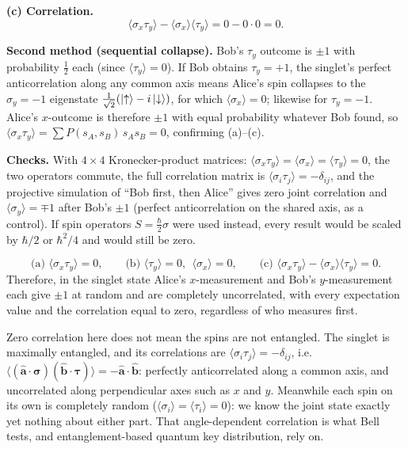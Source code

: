 \documentclass[12pt]{article}
\begin{document}
\begin{solutionbox}
\textbf{(c) Correlation.}
\[
\langle\sigma_x\tau_y\rangle-\langle\sigma_x\rangle\langle\tau_y\rangle=0-0\cdot0=0 .
\]

\textbf{Second method (sequential collapse).} Bob's $\tau_y$ outcome is $\pm1$ with probability $\tfrac12$ each (since $\langle\tau_y\rangle=0$). If Bob obtains $\tau_y=+1$, the singlet's perfect anticorrelation along any common axis means Alice's spin collapses to the $\sigma_y=-1$ eigenstate $\frac{1}{\sqrt2}(\ket{\uparrow}-i\ket{\downarrow})$, for which $\langle\sigma_x\rangle=0$; likewise for $\tau_y=-1$. Alice's $x$-outcome is therefore $\pm1$ with equal probability whatever Bob found, so $\langle\sigma_x\tau_y\rangle=\sum P(s_A,s_B)\,s_As_B=0$, confirming (a)--(c).

\textbf{Checks.} With $4\times4$ Kronecker-product matrices: $\langle\sigma_x\tau_y\rangle=\langle\sigma_x\rangle=\langle\tau_y\rangle=0$, the two operators commute, the full correlation matrix is $\langle\sigma_i\tau_j\rangle=-\delta_{ij}$, and the projective simulation of ``Bob first, then Alice'' gives zero joint correlation and $\langle\sigma_y\rangle=\mp1$ after Bob's $\pm1$ (perfect anticorrelation on the shared axis, as a control). If spin operators $S=\frac\hbar2\sigma$ were used instead, every result would be scaled by $\hbar/2$ or $\hbar^2/4$ and would still be zero.
\end{solutionbox}

\begin{answerbox}
\[
\text{(a) }\langle\sigma_x\tau_y\rangle=0,\qquad\text{(b) }\langle\tau_y\rangle=0,\ \ \langle\sigma_x\rangle=0,\qquad\text{(c) }\langle\sigma_x\tau_y\rangle-\langle\sigma_x\rangle\langle\tau_y\rangle=0 .
\]
Therefore, in the singlet state Alice's $x$-measurement and Bob's $y$-measurement each give $\pm1$ at random and are completely uncorrelated, with every expectation value and the correlation equal to zero, regardless of who measures first.
\end{answerbox}

\begin{insightbox}
Zero correlation here does not mean the spins are not entangled. The singlet is maximally entangled, and its correlations are $\langle\sigma_i\tau_j\rangle=-\delta_{ij}$, i.e.\ $\langle(\hat{\mathbf a}\cdot\boldsymbol\sigma)(\hat{\mathbf b}\cdot\boldsymbol\tau)\rangle=-\hat{\mathbf a}\cdot\hat{\mathbf b}$: perfectly anticorrelated along a common axis, and uncorrelated along perpendicular axes such as $x$ and $y$. Meanwhile each spin on its own is completely random ($\langle\sigma_i\rangle=\langle\tau_i\rangle=0$): we know the joint state exactly yet nothing about either part. That angle-dependent correlation is what Bell tests, and entanglement-based quantum key distribution, rely on.
\end{insightbox}
\fi
\end{document}
